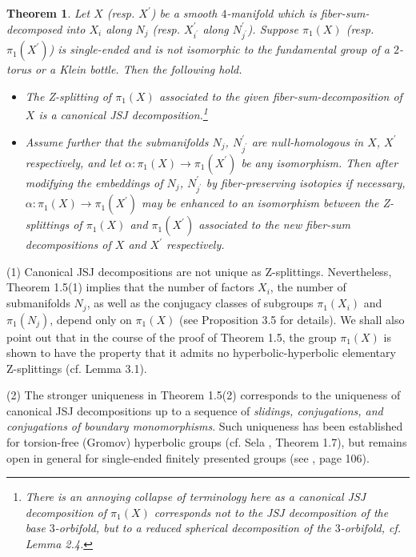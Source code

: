 \documentclass[11pt]{amsart}
\theoremstyle{plain}
\newtheorem{theorem}{Theorem}
\numberwithin{theorem}{section}
\theoremstyle{definition}
\begin{document}
\begin{theorem}
Let $X$ (resp. $X^\prime$) be a smooth $4$-manifold which is fiber-sum-decomposed into 
$X_i$ along $N_j$ (resp. $X^\prime_{i^\prime}$ along $N^\prime_{j^\prime}$). 
Suppose $\pi_1(X)$ (resp. $\pi_1(X^\prime)$) is single-ended and is not isomorphic to the 
fundamental group of a $2$-torus or a Klein bottle. Then the following hold.
\begin{itemize}
\item [{(1)}] The Z-splitting of $\pi_1(X)$ associated to the given fiber-sum-decomposition of 
$X$ is a canonical JSJ decomposition.\footnote{There is an annoying collapse of terminology here
as a canonical JSJ decomposition of $\pi_1(X)$ corresponds {\it not} to the JSJ decomposition of the
base $3$-orbifold, but to a reduced spherical decomposition of the $3$-orbifold, cf. Lemma 2.4.}
\item [{(2)}] Assume further that the submanifolds $N_j$, $N^\prime_{j^\prime}$ are 
null-homologous in $X$, $X^\prime$ respectively, and let 
$\alpha: \pi_1(X)\rightarrow \pi_1(X^\prime)$ 
be any isomorphism. Then after modifying the embeddings of $N_j$, $N^\prime_{j^\prime}$ by
fiber-preserving isotopies if necessary, $\alpha:  \pi_1(X)\rightarrow \pi_1(X^\prime)$ may be 
enhanced to an isomorphism between the Z-splittings of $\pi_1(X)$ and $\pi_1(X^\prime)$ 
associated to the new fiber-sum decompositions of $X$ and $X^\prime$ respectively. 
\end{itemize}
\end{theorem}

(1) Canonical JSJ decompositions are not unique as Z-splittings. Nevertheless, 
Theorem 1.5(1) implies that the number of factors $X_i$,  the number of submanifolds $N_j$, 
as well as the conjugacy classes of subgroups $\pi_1(X_i)$ and $\pi_1(N_j)$, depend only on 
$\pi_1(X)$ (see Proposition 3.5 for details). We shall also point out that in the course of
the proof of Theorem 1.5, the group $\pi_1(X)$ is shown to have the property that it admits 
no hyperbolic-hyperbolic elementary Z-splittings (cf. Lemma 3.1). 

(2) The stronger uniqueness in Theorem 1.5(2) corresponds to the uniqueness of canonical 
JSJ decompositions up to a sequence of {\it slidings, conjugations, and conjugations of boundary monomorphisms}. Such uniqueness has been established for torsion-free (Gromov) hyperbolic groups 
(cf. Sela \cite{Sela}, Theorem 1.7), but remains open in general for single-ended finitely presented 
groups (see \cite{RipS}, page 106).
\end{document}
